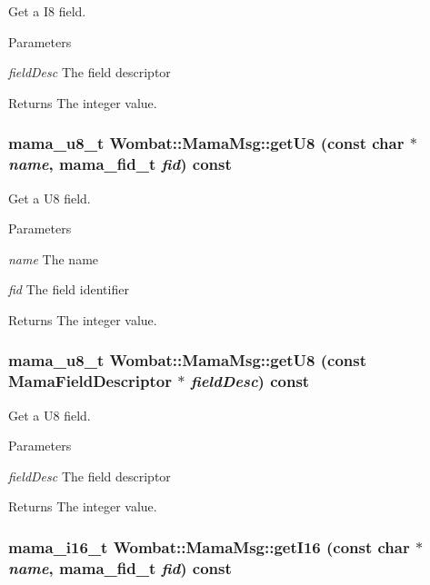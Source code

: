 Get a I8 field. 
\begin{DoxyParams}{Parameters}
\item[{\em fieldDesc}]The field descriptor \end{DoxyParams}
\begin{DoxyReturn}{Returns}
The integer value. 
\end{DoxyReturn}
\hypertarget{classWombat_1_1MamaMsg_a6bf8202a0808391d8c985a8e99f59065}{
\subsubsection[{getU8}]{\setlength{\rightskip}{0pt plus 5cm}mama\_\-u8\_\-t Wombat::MamaMsg::getU8 (const char $\ast$ {\em name}, \/  mama\_\-fid\_\-t {\em fid}) const}}
\label{classWombat_1_1MamaMsg_a6bf8202a0808391d8c985a8e99f59065}


Get a U8 field. 
\begin{DoxyParams}{Parameters}
\item[{\em name}]The name \item[{\em fid}]The field identifier \end{DoxyParams}
\begin{DoxyReturn}{Returns}
The integer value. 
\end{DoxyReturn}
\hypertarget{classWombat_1_1MamaMsg_a0ea0b1f54c72c8db781bd4eb165c34dc}{
\subsubsection[{getU8}]{\setlength{\rightskip}{0pt plus 5cm}mama\_\-u8\_\-t Wombat::MamaMsg::getU8 (const {\bf MamaFieldDescriptor} $\ast$ {\em fieldDesc}) const}}
\label{classWombat_1_1MamaMsg_a0ea0b1f54c72c8db781bd4eb165c34dc}


Get a U8 field. 
\begin{DoxyParams}{Parameters}
\item[{\em fieldDesc}]The field descriptor \end{DoxyParams}
\begin{DoxyReturn}{Returns}
The integer value. 
\end{DoxyReturn}
\hypertarget{classWombat_1_1MamaMsg_a4e00962efb3ccc875dc2842d9c0a36a8}{
\subsubsection[{getI16}]{\setlength{\rightskip}{0pt plus 5cm}mama\_\-i16\_\-t Wombat::MamaMsg::getI16 (const char $\ast$ {\em name}, \/  mama\_\-fid\_\-t {\em fid}) const}}
\label{classWombat_1_1MamaMsg_a4e00962efb3ccc875dc2842d9c0a36a8}


